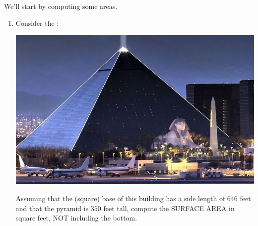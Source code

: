 \documentclass[hints,nooutcomes,noauthor,handout]{ximera}
\begin{document}
\begin{question} We'll start by computing some areas.
\begin{enumerate}
\item Consider the :
  \begin{center}
    \includegraphics[width=.4\textwidth]{pyramid.jpg} 
  \end{center}
 Assuming that the (square) base of this building has a side length of
 $646$ feet and that the pyramid is $350$ feet tall, compute the
 SURFACE AREA in square feet, NOT including the bottom. 
 

\end{enumerate}
\end{question}
\end{document}

